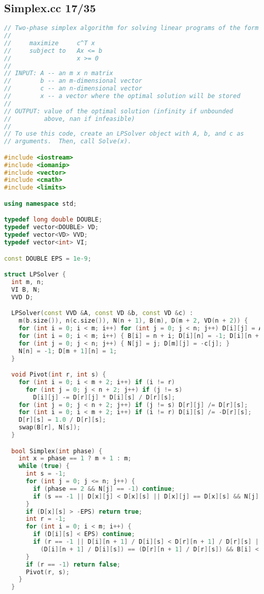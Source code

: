 \subsection{Simplex.cc 17/35}
\begin{lstlisting}[language=C++]
// Two-phase simplex algorithm for solving linear programs of the form
//
//     maximize     c^T x
//     subject to   Ax <= b
//                  x >= 0
//
// INPUT: A -- an m x n matrix
//        b -- an m-dimensional vector
//        c -- an n-dimensional vector
//        x -- a vector where the optimal solution will be stored
//
// OUTPUT: value of the optimal solution (infinity if unbounded
//         above, nan if infeasible)
//
// To use this code, create an LPSolver object with A, b, and c as
// arguments.  Then, call Solve(x).

#include <iostream>
#include <iomanip>
#include <vector>
#include <cmath>
#include <limits>

using namespace std;

typedef long double DOUBLE;
typedef vector<DOUBLE> VD;
typedef vector<VD> VVD;
typedef vector<int> VI;

const DOUBLE EPS = 1e-9;

struct LPSolver {
  int m, n;
  VI B, N;
  VVD D;

  LPSolver(const VVD &A, const VD &b, const VD &c) :
    m(b.size()), n(c.size()), N(n + 1), B(m), D(m + 2, VD(n + 2)) {
    for (int i = 0; i < m; i++) for (int j = 0; j < n; j++) D[i][j] = A[i][j];
    for (int i = 0; i < m; i++) { B[i] = n + i; D[i][n] = -1; D[i][n + 1] = b[i]; }
    for (int j = 0; j < n; j++) { N[j] = j; D[m][j] = -c[j]; }
    N[n] = -1; D[m + 1][n] = 1;
  }

  void Pivot(int r, int s) {
    for (int i = 0; i < m + 2; i++) if (i != r)
      for (int j = 0; j < n + 2; j++) if (j != s)
        D[i][j] -= D[r][j] * D[i][s] / D[r][s];
    for (int j = 0; j < n + 2; j++) if (j != s) D[r][j] /= D[r][s];
    for (int i = 0; i < m + 2; i++) if (i != r) D[i][s] /= -D[r][s];
    D[r][s] = 1.0 / D[r][s];
    swap(B[r], N[s]);
  }

  bool Simplex(int phase) {
    int x = phase == 1 ? m + 1 : m;
    while (true) {
      int s = -1;
      for (int j = 0; j <= n; j++) {
        if (phase == 2 && N[j] == -1) continue;
        if (s == -1 || D[x][j] < D[x][s] || D[x][j] == D[x][s] && N[j] < N[s]) s = j;
      }
      if (D[x][s] > -EPS) return true;
      int r = -1;
      for (int i = 0; i < m; i++) {
        if (D[i][s] < EPS) continue;
        if (r == -1 || D[i][n + 1] / D[i][s] < D[r][n + 1] / D[r][s] ||
          (D[i][n + 1] / D[i][s]) == (D[r][n + 1] / D[r][s]) && B[i] < B[r]) r = i;
      }
      if (r == -1) return false;
      Pivot(r, s);
    }
  }


\end{lstlisting}
